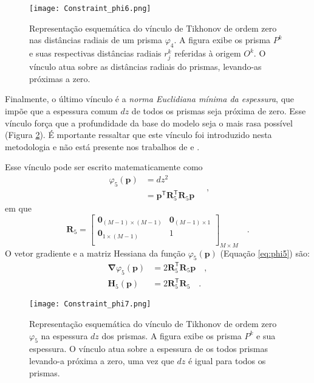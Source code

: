 \begin{figure}[!htb]
	\centering
	\texttt{[image: Constraint\_phi6.png]}
	\caption{Representação esquemática do vínculo de Tikhonov de ordem zero nas distâncias radiais de um prisma $\varphi_{4}$. A figura exibe os prisma $P^k$ e suas respectivas distâncias radiais $r_j^k$ referidas à origem $O^k$. O vínculo atua sobre as distâncias radiais do prismas, levando-as próximas a zero.}
	\label{fig:phi4}
\end{figure}

Finalmente, o último vínculo é a \textit{norma Euclidiana mínima da espessura}, que impõe que a espessura comum $ dz $ de todos os prismas seja próxima de zero. Esse vínculo força que a profundidade da base do modelo seja o mais rasa possível (Figura \ref{fig:phi5}). É mportante ressaltar que este vínculo foi introduzido nesta metodologia e não está presente nos trabalhos de \cite{oliveirajr_etal2011} e \cite{oliveirajr_barbosa2013}.

Esse vínculo pode ser escrito matematicamente como
\begin{equation}\label{eq:phi5}
\begin{split}
\varphi_{5}(\mathbf{p}) &= dz^2 \\
&= \mathbf{p}^{\mathsf{T}} \mathbf{R}_{5}^{\mathsf{T}} \mathbf{R}_{5} \mathbf{p}
\end{split} \quad ,
\end{equation}
em que
\begin{equation}
\mathbf{R}_{5} =
\begin{bmatrix}
\mathbf{0}_{(M-1) \times (M-1)} & \mathbf{0}_{(M-1) \times 1} \\
\mathbf{0}_{1 \times (M-1)} & 1 \\
\end{bmatrix}_{ M \times M } \quad .
\end{equation}
O vetor gradiente e a matriz Hessiana da função $\varphi_{5}(\mathbf{p})$ (Equação \ref{eq:phi5}) são:
\begin{equation}\label{eq:phi5_gh}
\begin{split}
\boldsymbol{\nabla}\varphi_{5}(\mathbf{p}) &= 2\mathbf{R}^\mathsf{T}_{5}\mathbf{R}_{5}\mathbf{p} \quad ,\\
\mathbf{H}_{5}(\mathbf{p}) &= 2\mathbf{R}^\mathsf{T}_{5}\mathbf{R}_{5} \quad .
\end{split}
\end{equation}

\begin{figure}[!htb]
	\centering
	\texttt{[image: Constraint\_phi7.png]}
	\caption{Representação esquemática do vínculo de Tikhonov de ordem zero $\varphi_{5}$ na espessura $dz$ dos prismas. A figura exibe os prisma $P^k$ e sua espessura. O vínculo atua sobre a espessura de os todos prismas levando-a próxima a zero, uma vez que $dz$ é igual para todos os prismas.}
	\label{fig:phi5}
\end{figure}

